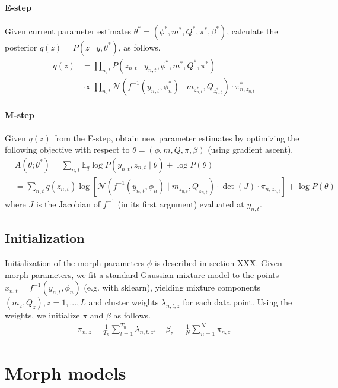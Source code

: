 \documentclass{article}         %
\newcommand{\EE}{\mathbb{E}}
\newcommand{\NN}{\mathcal{N}}
\begin{document}
\paragraph{E-step} Given current parameter estimates $\theta^* = (\phi^*, m^*, Q^*, \pi^*, \beta^*)$, calculate the posterior $q(z) = P(z \mid y, \theta^*)$, as follows.
%
\begin{align}
    q(z) & = \prod_{n,t} P(z_{n,t} \mid y_{n,t}, \phi^*, m^*, Q^*, \pi^*) \\
    & \propto  \prod_{n,t}  \NN(f^{-1}(y_{n,t}, \phi^*_n) \mid m_{z_{n,t}^*}, Q_{z_{n,t}^*}) \cdot \pi_{n,z_{n,t}}^* \label{eq:q-propto-statement}
\end{align}

\paragraph{M-step} Given $q(z)$ from the E-step, obtain new parameter estimates by optimizing the following objective with respect to $\theta = (\phi, m, Q, \pi, \beta)$ (using gradient ascent).
\begin{align}
    & A(\theta; \theta^*)  = \sum_{n,t} \EE_q \log P(y_{n,t}, z_{n,t} \mid \theta) + \log P(\theta) \\
    & =  \sum_{n,t} q(z_{n,t}) \log \left[ \NN(f^{-1}(y_{n,t}, \phi_n) \mid m_{z_{n,t}}, Q_{z_{n,t}}) \cdot \det(J)  \cdot \pi_{n, z_{n, t}} \right] + \log P(\theta) \label{eq:A-modeled}
\end{align}
where $J$ is the Jacobian of $f^{-1}$ (in its first argument) evaluated at $y_{n,t}$.

\subsection{Initialization}
Initialization of the morph parameters $\phi$ is described in section XXX. Given morph parameters, we fit a standard Gaussian mixture model to the points $x_{n,t} = f^{-1}(y_{n,t}, \phi_n)$ (e.g. with sklearn), yielding mixture components $(m_z, Q_z), z=1,...,L$ and cluster weights $\lambda_{n,t,z}$ for each data point. Using the weights, we initialize $\pi$ and $\beta$ as follows.
\begin{align}
    \pi_{n,z} = \frac{1}{T_n} \sum_{t=1}^{T_n} \lambda_{n,t,z}, \quad \beta_z = \frac{1}{N} \sum_{n=1}^N \pi_{n,z}
\end{align}

\section{Morph models}
\end{document}
